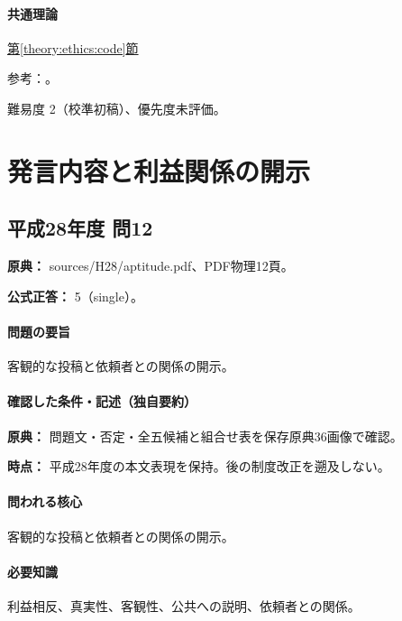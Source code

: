 \paragraph{共通理論} \hyperref[theory:ethics:code]{第\ref*{theory:ethics:code}節}

\par 参考：\cite{ipej_ethics2023}。

\par 難易度 2（校準初稿）、優先度未評価。

\section{発言内容と利益関係の開示}

\subsection{平成28年度 問12}
\label{q:h28-reg-apt-12}

\noindent\textbf{原典：} sources/H28/aptitude.pdf、PDF物理12頁。

\textbf{公式正答：} 5（single）。

\paragraph{問題の要旨} 客観的な投稿と依頼者との関係の開示。

\paragraph{確認した条件・記述（独自要約）}\mbox{}\par

\noindent\textbf{原典：} 問題文・否定・全五候補と組合せ表を保存原典36画像で確認。\par

\noindent\textbf{時点：} 平成28年度の本文表現を保持。後の制度改正を遡及しない。\par

\paragraph{問われる核心} 客観的な投稿と依頼者との関係の開示。

\paragraph{必要知識} 利益相反、真実性、客観性、公共への説明、依頼者との関係。

